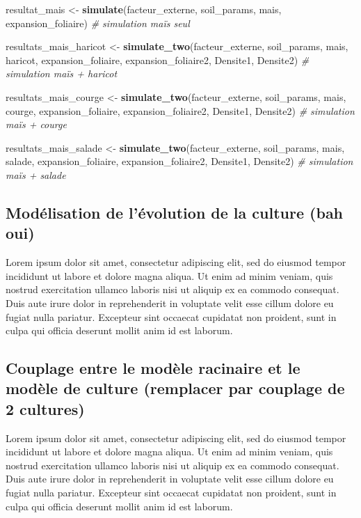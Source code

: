 \documentclass[
]{article}
\newenvironment{Shaded}{\begin{snugshade}}{\end{snugshade}}
\newcommand{\CommentTok}[1]{\textcolor[rgb]{0.56,0.35,0.01}{\textit{#1}}}
\newcommand{\FunctionTok}[1]{\textcolor[rgb]{0.13,0.29,0.53}{\textbf{#1}}}
\newcommand{\NormalTok}[1]{#1}
\newcommand{\OtherTok}[1]{\textcolor[rgb]{0.56,0.35,0.01}{#1}}
\begin{document}
\begin{Shaded}
\begin{Highlighting}[]
\NormalTok{resultat\_mais }\OtherTok{\textless{}{-}} \FunctionTok{simulate}\NormalTok{(facteur\_externe, soil\_params, mais, expansion\_foliaire) }\CommentTok{\# simulation maïs seul}

\NormalTok{resultats\_mais\_haricot }\OtherTok{\textless{}{-}} \FunctionTok{simulate\_two}\NormalTok{(facteur\_externe, soil\_params, mais, haricot, expansion\_foliaire, expansion\_foliaire2, Densite1, Densite2) }\CommentTok{\# simulation maïs + haricot}

\NormalTok{resultats\_mais\_courge }\OtherTok{\textless{}{-}} \FunctionTok{simulate\_two}\NormalTok{(facteur\_externe, soil\_params, mais, courge, expansion\_foliaire, expansion\_foliaire2, Densite1, Densite2) }\CommentTok{\# simulation maïs + courge}

\NormalTok{resultats\_mais\_salade }\OtherTok{\textless{}{-}} \FunctionTok{simulate\_two}\NormalTok{(facteur\_externe, soil\_params, mais, salade, expansion\_foliaire, expansion\_foliaire2, Densite1, Densite2) }\CommentTok{\# simulation maïs + salade}
\end{Highlighting}
\end{Shaded}

\subsection{Modélisation de l'évolution de la culture (bah
oui)}\label{moduxe9lisation-de-luxe9volution-de-la-culture-bah-oui}

Lorem ipsum dolor sit amet, consectetur adipiscing elit, sed do eiusmod
tempor incididunt ut labore et dolore magna aliqua. Ut enim ad minim
veniam, quis nostrud exercitation ullamco laboris nisi ut aliquip ex ea
commodo consequat. Duis aute irure dolor in reprehenderit in voluptate
velit esse cillum dolore eu fugiat nulla pariatur. Excepteur sint
occaecat cupidatat non proident, sunt in culpa qui officia deserunt
mollit anim id est laborum.

\subsection{Couplage entre le modèle racinaire et le modèle de culture
(remplacer par couplage de 2
cultures)}\label{couplage-entre-le-moduxe8le-racinaire-et-le-moduxe8le-de-culture-remplacer-par-couplage-de-2-cultures}

Lorem ipsum dolor sit amet, consectetur adipiscing elit, sed do eiusmod
tempor incididunt ut labore et dolore magna aliqua. Ut enim ad minim
veniam, quis nostrud exercitation ullamco laboris nisi ut aliquip ex ea
commodo consequat. Duis aute irure dolor in reprehenderit in voluptate
velit esse cillum dolore eu fugiat nulla pariatur. Excepteur sint
occaecat cupidatat non proident, sunt in culpa qui officia deserunt
mollit anim id est laborum.
\end{document}
